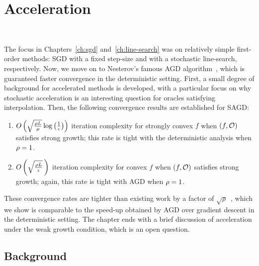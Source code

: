 
\chapter{Acceleration}~\label{ch:acceleration}

The focus in Chapters~\ref{ch:sgd} and~\ref{ch:line-search} was on relatively simple first-order methods: \ac{SGD} with a fixed step-size and with a stochastic line-search, respectively.
Now, we move on to Nesterov's famous \ac{AGD} algorithm~\cite{nesterov2004lectures}, which is guaranteed faster convergence in the deterministic setting. 
First, a small degree of background for accelerated methods is developed, with a particular focus on why stochastic acceleration is an interesting question for oracles satisfying interpolation.
Then, the following convergence results are established for \ac{SAGD}:
\begin{enumerate}
    \item \( O\rbr{\sqrt{\frac{\sgc L}{\mu}} \log \rbr{\inv{\epsilon}}} \) iteration complexity for strongly convex \( f \) when \( \rbr{f, \oracle{}} \) satisfies strong growth; this rate is tight with the deterministic analysis when \( \sgc = 1 \).
    \item \( O\rbr{\sqrt{\frac{\sgc L}{\epsilon}} \,} \) iteration complexity for convex \( f \) when \( \rbr{f, \oracle{}} \) satisfies strong growth; again, this rate is tight with \ac{AGD} when \( \sgc = 1 \).
\end{enumerate}
These convergence rates are tighter than existing work by a factor of \( \sqrt{\rho} \)~\citep[Theorems 1-2]{vaswani2019fast}, which we show is comparable to the speed-up obtained by \ac{AGD} over gradient descent in the deterministic setting.
The chapter ends with a brief discussion of acceleration under the weak growth condition, which is an open question.
\newpage

\section{Background}~\label{sec:agd-background}


